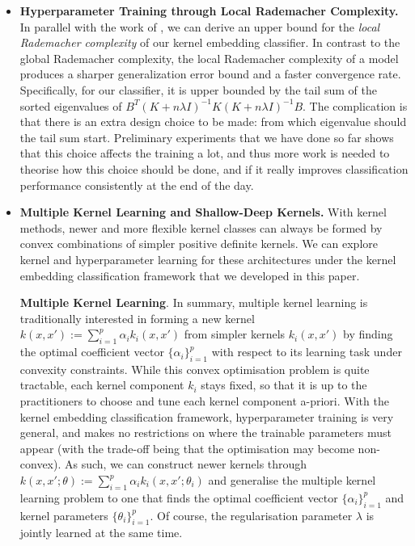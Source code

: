 \documentclass{article}
\begin{document}
	\begin{itemize}
		\item \textbf{Hyperparameter Training through Local Rademacher Complexity.} In parallel with the work of \cite{xu2016local}, we can derive an upper bound for the \textit{local Rademacher complexity} of our kernel embedding classifier. In contrast to the global Rademacher complexity, the local Rademacher complexity of a model produces a sharper generalization error bound and a faster convergence rate. Specifically, for our classifier, it is upper bounded by the tail sum of the sorted eigenvalues of $B^{T} (K + n \lambda I)^{-1} K (K + n \lambda I)^{-1} B$. The complication is that there is an extra design choice to be made: from which eigenvalue should the tail sum start. Preliminary experiments that we have done so far shows that this choice affects the training a lot, and thus more work is needed to theorise how this choice should be done, and if it really improves classification performance consistently at the end of the day.

		\item \textbf{Multiple Kernel Learning and Shallow-Deep Kernels.} With kernel methods, newer and more flexible kernel classes can always be formed by convex combinations of simpler positive definite kernels. We can explore kernel and hyperparameter learning for these architectures under the kernel embedding classification framework that we developed in this paper.
		
		\textbf{Multiple Kernel Learning}. In summary, multiple kernel learning is traditionally interested in forming a new kernel $k(x, x') := \sum_{i = 1}^{p} \alpha_{i} k_{i}(x, x')$ from simpler kernels $k_{i}(x, x')$ by finding the optimal coefficient vector $\{\alpha_{i}\}_{i = 1}^{p}$ with respect to its learning task under convexity constraints. While this convex optimisation problem is quite tractable, each kernel component $k_{i}$ stays fixed, so that it is up to the practitioners to choose and tune each kernel component a-priori. With the kernel embedding classification framework, hyperparameter training is very general, and makes no restrictions on where the trainable parameters must appear (with the trade-off being that the optimisation may become non-convex). As such, we can construct newer kernels through $k(x, x'; \theta) := \sum_{i = 1}^{p} \alpha_{i} k_{i}(x, x'; \theta_{i})$ and generalise the multiple kernel learning problem to one that finds the optimal coefficient vector $\{\alpha_{i}\}_{i = 1}^{p}$ and kernel parameters $\{\theta_{i}\}_{i = 1}^{p}$. Of course, the regularisation parameter $\lambda$ is jointly learned at the same time.
		

\end{itemize}
\end{document}
